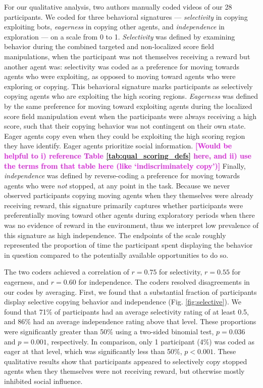 \documentclass[12pt,letterpaper]{article}
\newcommand{\andrew}[1]{\textcolor{magenta}{\bf [#1]}}
\begin{document}
For our qualitative analysis, two authors manually coded videos of our 28 participants. We coded for three behavioral signatures --- \emph{selectivity} in copying exploiting bots, \emph{eagerness} in copying other agents, and \emph{independence} in exploration --- on a scale from 0 to 1. \emph{Selectivity} was defined by examining behavior during the combined targeted and non-localized score field manipulations, when the participant was not themselves receiving a reward but another agent was: selectivity was coded as a preference for moving towards agents who were exploiting, as opposed to moving toward agents who were exploring or copying. This behavioral signature marks participants as selectively copying agents who are exploiting the high scoring regions.
\emph{Eagerness} was defined by the same preference for moving toward exploiting agents during the localized score field manipulation event when the participants were always receiving a high score, such that their copying behavior was not contingent on their own state. Eager agents copy even when they could be exploiting the high scoring region they have identify. Eager agents prioritize social information. \andrew{Would be helpful to i) reference Table \ref{tab:qual_scoring_defs} here, and ii) use the terms from that table here (like `indiscriminately copy')}
Finally, \emph{independence} was defined by reverse-coding a preference for moving towards agents who were \emph{not} stopped, at any point in the task. Because we never observed participants copying moving agents when they themselves were already receiving reward, this signature primarily captures whether participants were preferentially moving toward other agents during exploratory periods when there was no evidence of reward in the environment, thus we interpret low prevalence of this signature as high independence. 
The endpoints of the scale roughly represented the proportion of time the participant spent displaying the behavior in question compared to the potentially available opportunities to do so. 

The two coders achieved a correlation of $r = 0.75$ for selectivity, $r = 0.55$ for eagerness, and $r = 0.60$ for independence. The coders resolved disagreements in our codes by averaging. 
First, we found that a substantial fraction of participants display selective copying behavior and independence (Fig. \ref{fig:selective}). 
We found that 71\% of participants had an average selectivity rating of at least 0.5, and 86\% had an average independence rating above that level. 
These proportions were significantly greater than 50\% using a two-sided binomial test, $p = 0.036$ and $p = 0.001$, respectively.  
In comparison, only 1 participant (4\%) was coded as eager at that level, which was significantly less than 50\%, $p < 0.001$.
These qualitative results show that participants appeared to selectively copy stopped agents when they themselves were not receiving reward, but otherwise mostly inhibited social influence.
\end{document}

